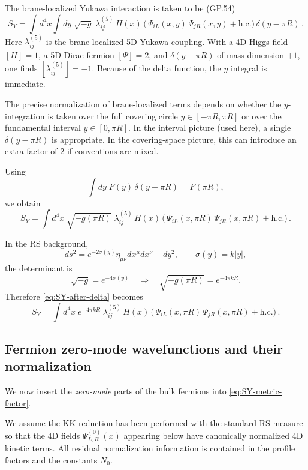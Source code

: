 \documentclass[11pt]{article}
\begin{document}
The brane-localized Yukawa interaction is taken to be (GP.54)
\begin{equation}
S_Y
=
\int d^4x \int dy\;
\sqrt{-g}\;
\lambda^{(5)}_{ij}\,H(x)\,
\Big(\,\overline{\Psi}_{iL}(x,y)\,\Psi_{jR}(x,y)+\text{h.c.}\Big)\,
\delta(y-\pi R)\,.
\label{eq:SY-start}
\end{equation}
Here $\lambda^{(5)}_{ij}$ is the brane-localized 5D Yukawa coupling. With a 4D Higgs field
$[H]=1$, a 5D Dirac fermion $[\Psi]=2$, and $\delta(y-\pi R)$ of mass dimension $+1$, one finds
$[\lambda^{(5)}_{ij}]=-1$. Because of the delta function, the $y$ integral is immediate.
\begin{notationbox}
  The precise normalization of brane-localized terms depends on whether the $y$-integration is taken
  over the full covering circle $y\in[-\pi R,\pi R]$ or over the fundamental interval $y\in[0,\pi R]$.
  In the interval picture (used here), a single $\delta(y-\pi R)$ is appropriate. In the covering-space
  picture, this
  can introduce an extra factor of $2$ if conventions are mixed.
\end{notationbox}
Using
\[
\int dy\; F(y)\,\delta(y-\pi R) = F(\pi R),
\]
we obtain
\begin{equation}
S_Y
=
\int d^4x\;
\sqrt{-g(\pi R)}\;
\lambda^{(5)}_{ij}\,H(x)\,
\Big(\,\overline{\Psi}_{iL}(x,\pi R)\,\Psi_{jR}(x,\pi R)+\text{h.c.}\Big)\,.
\label{eq:SY-after-delta}
\end{equation}

In the RS background,
\[
ds^2=e^{-2\sigma(y)}\eta_{\mu\nu}dx^\mu dx^\nu + dy^2,
\qquad
\sigma(y)=k|y|,
\]
the determinant is
\[
\sqrt{-g}=e^{-4\sigma(y)} \quad \Longrightarrow \quad \sqrt{-g(\pi R)}=e^{-4\pi kR}.
\]
Therefore \eqref{eq:SY-after-delta} becomes
\begin{equation}
S_Y
=
\int d^4x\;
e^{-4\pi kR}\;
\lambda^{(5)}_{ij}\,H(x)\,
\Big(\,\overline{\Psi}_{iL}(x,\pi R)\,\Psi_{jR}(x,\pi R)+\text{h.c.}\Big)\,.
\label{eq:SY-metric-factor}
\end{equation}

\subsection{Fermion zero-mode wavefunctions and their normalization}

We now insert the \emph{zero-mode} parts of the bulk fermions into \eqref{eq:SY-metric-factor}.
\begin{notationbox}
  We assume the KK reduction has been performed with the standard RS measure so that the 4D fields
  $\Psi^{(0)}_{L,R}(x)$ appearing below have canonically normalized 4D kinetic terms. All residual
  normalization information is contained in the profile factors and the constants $N_0$.
\end{notationbox}
\end{document}
